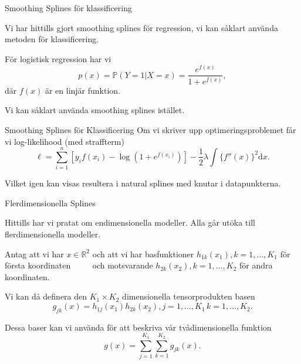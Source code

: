 \documentclass[10pt,english]{beamer}
\begin{document}
\begin{frame}{Smoothing Splines för klassificering}
    
    Vi har hittills gjort smoothing splines för regression, vi kan såklart använda metoden för klassificering.

    För logistisk regression har vi
    \begin{equation*}
        p(x) = \mathbb{P}(Y = 1 | X = x) = \frac{e^{f(x)}}{1 + e^{f(x)}},
    \end{equation*}
    där $f(x)$ är en linjär funktion.

    Vi kan såklart använda smoothing splines istället.

\end{frame}

\begin{frame}{Smoothing Splines för Klassificering}
    Om vi skriver upp optimeringsproblemet får vi log-likelihood (med straffterm)
    \begin{equation*}
        \ell = \sum_{i=1}^{n} \left[y_i f(x_i) - \log(1 + e^{f(x_i)}) \right] - \frac{1}{2}\lambda \int \{ f''(x)\}^2 \mathrm{d}x.
    \end{equation*}

    Vilket igen kan visas resultera i natural splines med knutar i datapunkterna.
\end{frame}

\begin{frame}{Flerdimensionella Splines}
    
    Hittills har vi pratat om endimensionella modeller. Alla går utöka till flerdimensionella modeller.

    Antag att vi har $x \in \mathbb{R}^2$ och att vi har basfunktioner $h_{1k}(x_1), k = 1, \ldots, K_1$ för första koordinaten $\qquad$ och motsvarande $h_{2k}(x_2), k = 1, \ldots, K_2$ för andra koordinaten.

    Vi kan då definera den $K_1 \times K_2$ dimensionella tensorprodukten basen
    \begin{equation*}
        g_{jk}(x) = h_{1j}(x_1)h_{2k}(x_2), j = 1,\ldots,K_1 \, k = 1, \ldots, K_2.
    \end{equation*}

    Dessa baser kan vi använda för att beskriva vår tvådimensionella funktion
    \begin{equation*}
        g(x) = \sum_{j=1}^{K_1} \sum_{k=1}^{K_2} g_{jk}(x).
    \end{equation*}

\end{frame}
\end{document}

